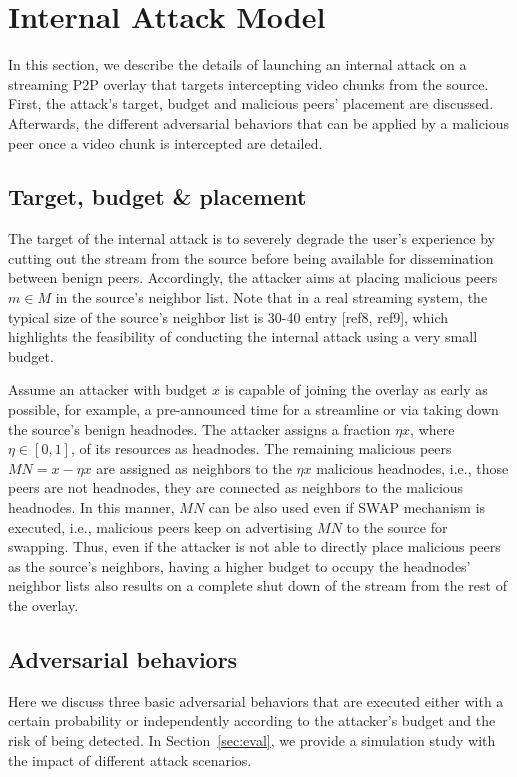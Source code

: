 \section{Internal Attack Model}
\label{sec:Attack}

In this section, we describe the details of launching an internal attack on a streaming P2P overlay that targets intercepting video chunks from the source. 
First, the attack's target, budget and malicious peers' placement are discussed.
Afterwards, the different adversarial behaviors that can be applied by a malicious peer once a video chunk is intercepted are detailed.

\subsection{Target, budget \& placement}

The target of the internal attack is to severely degrade the user's experience by cutting out the stream from the source before being available for dissemination between benign peers.
Accordingly, the attacker aims at placing malicious peers $m\in M$ in the source's neighbor list.
Note that in a real streaming system, the typical size of the source's neighbor list is 30-40 entry [ref8, ref9], which highlights the feasibility of conducting the internal attack using a very small budget.


Assume an attacker with budget $x$ is capable of joining the overlay as early as possible, for example, a pre-announced time for a streamline or via taking down the source's benign headnodes.
The attacker assigns a fraction $\eta x$, where $\eta\in [0,1]$, of its resources as headnodes.
The remaining malicious peers $MN=x-\eta x$ are assigned as neighbors to the $\eta x$ malicious headnodes, i.e., those peers are not headnodes, they are connected as neighbors to the malicious headnodes.
In this manner, $MN$ can be also used even if SWAP \cite{nguyen2016swap} mechanism is executed, i.e., malicious peers keep on advertising $MN$ to the source for swapping.
Thus, even if the attacker is not able to directly place malicious peers as the source's neighbors, having a higher budget to occupy the headnodes' neighbor lists also results on a complete shut down of the stream from the rest of the overlay.

\subsection{Adversarial behaviors}
Here we discuss three basic adversarial behaviors that are executed either with a certain probability or independently according to the attacker's budget and the risk of being detected.
In Section~\ref{sec:eval}, we provide a simulation study with the impact of different attack scenarios.

